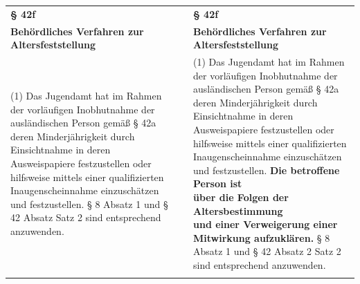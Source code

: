 \documentclass[10pt,a4paper,landscape]{article}
\begin{document}
\begin{longtable}{|L{8.2cm}|L{8.2cm}|L{8.2cm}|}
\hhline{|---|}
\textbf{\S{} 42f} &  & \textbf{\S{} 42f} \\
\hhline{|---|}
\textbf{Behördliches Verfahren zur  \newline Altersfeststellung} &  & \textbf{Behördliches Verfahren zur  \newline Altersfeststellung} \\
\hhline{|---|}
(1) Das Jugendamt hat im Rahmen der  \newline vorläufigen Inobhutnahme der  \newline ausländischen Person gemäß \S{} 42a deren  \newline Minderjährigkeit durch Einsichtnahme in  \newline deren Ausweispapiere festzustellen oder  \newline hilfsweise mittels einer qualifizierten  \newline Inaugenscheinnahme einzuschätzen und  \newline festzustellen. \S{} 8 Absatz 1 und \S{} 42 Absatz   Satz 2 sind entsprechend anzuwenden. &  & (1) Das Jugendamt hat im Rahmen der  \newline vorläufigen Inobhutnahme der  \newline ausländischen Person gemäß \S{} 42a deren  \newline Minderjährigkeit durch Einsichtnahme in  \newline deren Ausweispapiere festzustellen oder  \newline hilfsweise mittels einer qualifizierten  \newline Inaugenscheinnahme einzuschätzen und  \newline festzustellen. \textbf{\textcolor{diffgreen}{Die betroffene Person ist  \newline über die Folgen der Altersbestimmung  \newline und einer Verweigerung einer  \newline Mitwirkung aufzuklären.}} \S{} 8 Absatz 1 und  \newline \S{} 42 Absatz 2 Satz 2 sind entsprechend  \newline anzuwenden. \\
\hhline{|---|}

\end{longtable}
\end{document}

